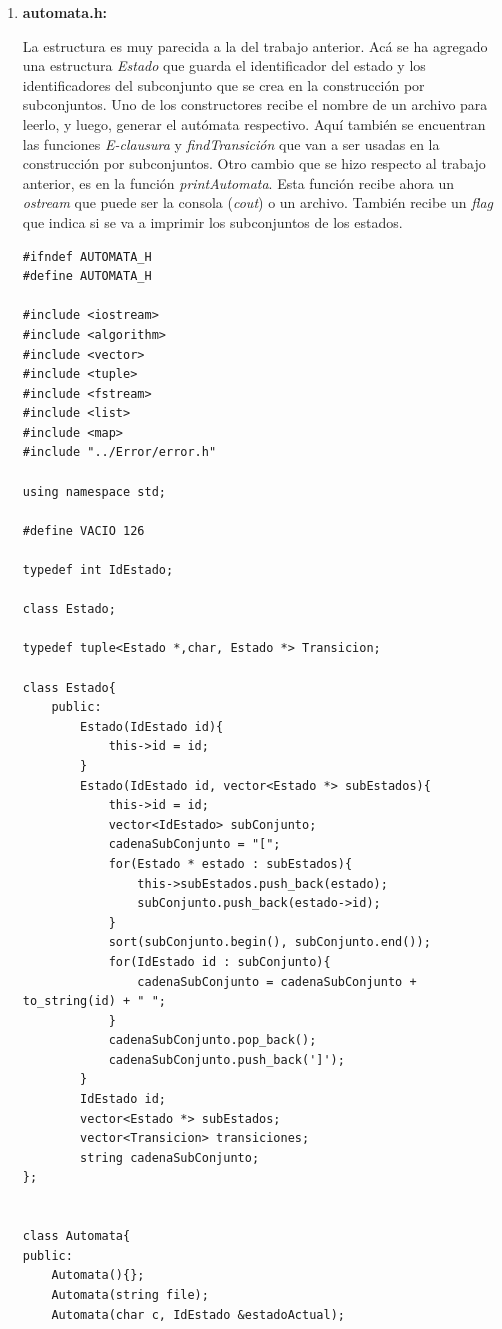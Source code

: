 \documentclass[a4paper,12pt]{article}
\begin{document}
\begin{enumerate}
 \item \textbf{automata.h:} \par
 La estructura es muy parecida a la del trabajo anterior. Acá se ha agregado una estructura \textit{Estado} que guarda el identificador del estado y los identificadores
 del subconjunto que se crea en la construcción por subconjuntos. Uno de los constructores recibe el nombre de un archivo para leerlo, y luego, generar el autómata
 respectivo. Aquí también se encuentran las funciones \textit{E-clausura} y \textit{findTransición} que van a ser usadas en la construcción por subconjuntos. Otro cambio que
 se hizo respecto al trabajo anterior, es en la función \textit{printAutomata}. Esta función recibe ahora un \textit{ostream} que puede ser la consola (\textit{cout}) o un
 archivo. También recibe un \textit{flag} que indica si se va a imprimir los subconjuntos de los estados.
 
 \begin{lstlisting}
#ifndef AUTOMATA_H
#define AUTOMATA_H

#include <iostream>
#include <algorithm>
#include <vector>
#include <tuple>
#include <fstream>
#include <list>
#include <map>
#include "../Error/error.h"

using namespace std;

#define VACIO 126

typedef int IdEstado;

class Estado;

typedef tuple<Estado *,char, Estado *> Transicion;

class Estado{
    public:
        Estado(IdEstado id){
            this->id = id;
        }
        Estado(IdEstado id, vector<Estado *> subEstados){
            this->id = id;
            vector<IdEstado> subConjunto;
            cadenaSubConjunto = "[";
            for(Estado * estado : subEstados){
                this->subEstados.push_back(estado);
                subConjunto.push_back(estado->id);
            }
            sort(subConjunto.begin(), subConjunto.end());
            for(IdEstado id : subConjunto){
                cadenaSubConjunto = cadenaSubConjunto + to_string(id) + " ";
            }
            cadenaSubConjunto.pop_back();            
            cadenaSubConjunto.push_back(']');
        }
        IdEstado id;
        vector<Estado *> subEstados;
        vector<Transicion> transiciones;
        string cadenaSubConjunto;
}; 


class Automata{
public:
    Automata(){};
    Automata(string file);
    Automata(char c, IdEstado &estadoActual);


\end{lstlisting}
\end{enumerate}
\end{document}
